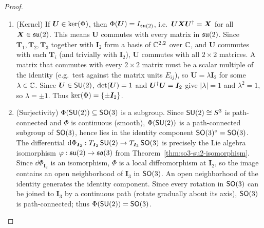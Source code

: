 \documentclass[11pt,reqno]{amsart}
\renewcommand{\phi}{\varphi}
\begin{document}
\begin{proof}
\begin{enumerate}
\item (Kernel)
If $\bm U\in\ker\Br{\Phi}$, then $\Phi(\bm U)=I_{\mathfrak{su}(2)}$, i.e.\
$\bm U\bm X\bm U^{\dagger}=\bm X$ for all $\bm X\in\mathfrak{su}(2)$.
This means $\bm U$ commutes with every matrix in $\mathfrak{su}(2)$.
Since $\bm T_1,\bm T_2,\bm T_3$ together with $\bm I_2$ form a basis of
$\mathbb{C}^{2,2}$ over $\mathbb{C}$, and $\bm U$ commutes with each $\bm T_i$ (and
trivially with $\bm I_2$), $\bm U$ commutes with all $2\times 2$ matrices.
A matrix that commutes with every $2\times 2$ matrix must be a scalar
multiple of the identity (e.g.\ test against the matrix units $E_{ij}$),
so $\bm U=\lambda\bm I_2$ for some
$\lambda\in\mathbb{C}$.  Since $\bm U\in\operatorname{\mathsf{SU}}(2)$, $\det\Br{\bm U}=1$ and
$\bm U^{\dagger}\bm U=\bm I_2$ give $|\lambda|=1$ and $\lambda^2=1$, so
$\lambda=\pm1$.  Thus $\ker\Br{\Phi}=\set{\pm\bm I_2}$.

\item (Surjectivity)
$\Phi(\operatorname{\mathsf{SU}}(2))\subseteq\operatorname{\mathsf{SO}}(3)$ is a subgroup.  Since $\operatorname{\mathsf{SU}}(2)\cong S^3$ is
path-connected and $\Phi$ is continuous (smooth), $\Phi(\operatorname{\mathsf{SU}}(2))$ is a
path-connected subgroup of $\operatorname{\mathsf{SO}}(3)$, hence lies in the identity component
$\operatorname{\mathsf{SO}}(3)^\circ=\operatorname{\mathsf{SO}}(3)$.
The differential $\mathrm{d}\Phi_{\bm I_2}:T_{\bm I_2}\operatorname{\mathsf{SU}}(2)\to T_{\bm I_3}\operatorname{\mathsf{SO}}(3)$
is precisely the Lie algebra isomorphism
$\phi:\su(2)\to\so(3)$ from Theorem~\ref{thm:so3-su2-isomorphism}.
Since $\dd\Phi_{\bm I_2}$ is an isomorphism, $\Phi$ is a local diffeomorphism
at $\bm I_2$, so the image contains an open neighborhood of $\bm I_3$ in
$\operatorname{\mathsf{SO}}(3)$.  An open neighborhood of the identity generates the identity
component.  Since every rotation in $\operatorname{\mathsf{SO}}(3)$ can be joined to $\bm I_3$ by a
continuous path (rotate gradually about its axis), $\operatorname{\mathsf{SO}}(3)$ is path-connected;
thus $\Phi(\operatorname{\mathsf{SU}}(2))=\operatorname{\mathsf{SO}}(3)$.
\end{enumerate}
\end{proof}
\end{document}
